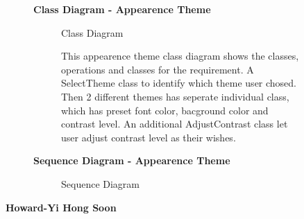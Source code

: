 \documentclass{article}
\begin{document}
		\clearpage

		\begin{figure}[htbp]
			\textbf{Class Diagram - Appearence Theme }
			\centering
			\begin{subfigure}{\textwidth}
				\resizebox{\textwidth}{!}{}
				\caption{Class Diagram}
			\end{subfigure}
			\begin{subfigure}{\textwidth}
				This appearence theme class diagram shows the classes, operations and classes for the requirement. A SelectTheme class to identify
				which theme user chosed. Then 2 different themes has seperate individual class, which has preset font color, bacground color and 
				contrast level. An additional AdjustContrast class let user adjust contrast level as their wishes.
			\end{subfigure}
		\end{figure}
		\clearpage
		

		\begin{figure}[htbp]
			\textbf{Sequence Diagram - Appearence Theme }
			\centering
			\begin{subfigure}{\textwidth}
				\scalebox{0.6}{}
				\caption{Sequence Diagram}
			\end{subfigure}
			\begin{subfigure}{\textwidth}
			\end{subfigure}
		\end{figure}
		\clearpage

		\textbf{Howard-Yi Hong Soon}
\end{document}
